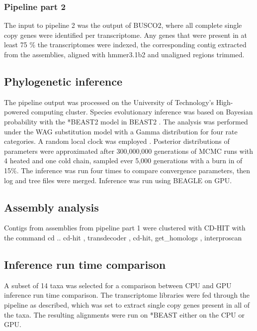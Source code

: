 \documentclass[12pt]{article}
\begin{document}
\subsubsection*{Pipeline part 2}
The input to pipeline 2 was the output of BUSCO2, where all complete single copy genes were identified per transcriptome. 
Any genes that were present in at least 75 \% the transcriptomes were indexed, the corresponding contig extracted from the assemblies, aligned with hmmer3.1b2 \cite{eddy2015hmmer} and unaligned regions trimmed.
\subsection*{Phylogenetic inference}
The pipeline output was processed on the University of Technology's High-powered computing cluster.
Species evolutionary inference was based on Bayesian probability with the *BEAST2 model in BEAST2 \cite{bouckaert2014beast}. 
The analysis was performed under the WAG substitution model \cite{whelan2001general} with a Gamma distribution for four rate categories. 
A random local clock was employed \cite{drummond2010bayesian}. 
Posterior distributions of parameters were approximated after 300,000,000 generations of MCMC runs with 4 heated and one cold chain, sampled ever 5,000 generations  with a burn in of 15\%. 
The inference was run four times to compare convergence parameters, then log and tree files were merged. 
Inference was run using BEAGLE \cite{ayres2011beagle} on GPU.

\subsection*{Assembly analysis}
Contigs from assemblies from pipeline part 1 were clustered with CD-HIT with the command cd ..
cd-hit \cite{fu2012cd}, transdecoder \cite{haas2016transdecoder}, cd-hit, get\_homologs \cite{contreras2013gethom}, interproscan \cite{quevillon2005interproscan}
\subsection*{Inference run time comparison}
A subset of 14 taxa was selected for a comparison between CPU and GPU inference run time comparison. 
The transcriptome libraries were fed through the pipeline as described, which was set to extract single copy genes present in all of the taxa. 
The resulting alignments were run on *BEAST either on the CPU or GPU.
\end{document}
